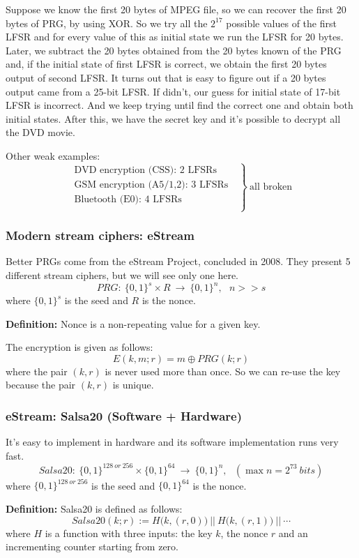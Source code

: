 \documentclass[12pt]{book}
\newcommand{\Def}{\textcolor{dkgreen}{\textbf{Definition:}} }
\begin{document}
Suppose we know the first 20 bytes of MPEG file, so we can recover the first 20 bytes of PRG, by using XOR. So we try all the $2^{17}$ possible values of the first LFSR and for every value of this as initial state we run the LFSR for 20 bytes. Later, we subtract the 20 bytes obtained from the 20 bytes known of the PRG and, if the initial state of first LFSR is correct, we obtain the first 20 bytes output of second LFSR. It turns out that is easy to figure out if a 20 bytes output came from a 25-bit LFSR. If didn't, our guess for initial state of 17-bit LFSR is incorrect. And we keep trying until find the correct one and obtain both initial states. After this, we have the secret key and it's possible to decrypt all the DVD movie.

Other weak examples:
$$\left.\begin{array}{l}
	\text{DVD encryption (CSS): 2 LFSRs}\\[0.2cm]
	\text{GSM encryption (A5/1,2): 3 LFSRs}\\[0.2cm]
	\text{Bluetooth (E0): 4 LFSRs}\\
\end{array}\ \ \ \right\}\ \text{all broken}$$

\subsubsection{Modern stream ciphers: eStream}
Better PRGs come from the eStream Project, concluded in 2008. They present 5 different stream ciphers, but we will see only one here.
$$PRG:\ \{0,1\}^{s}\times R\ \rightarrow\ \{0,1\}^{n},\ \ \ n>>s$$where $\{0,1\}^{s}$ is the seed and $R$ is the nonce.

\Def Nonce is a non-repeating value for a given key.

The encryption is given as follows:
$$E(k,m;r)=m\oplus PRG(k;r)$$where the pair $(k,r)$ is never used more than once. So we can re-use the key because the pair $(k,r)$ is unique.

\subsubsection{eStream: Salsa20 (Software + Hardware)}
It's easy to implement in hardware and its software implementation runs very fast.
$$Salsa20:\ \{0,1\}^{128\ or\ 256}\times\{0,1\}^{64}\ \rightarrow\ \{0,1\}^{n},\ \ \ (\max n=2^{73}\ bits)$$where $\{0,1\}^{128\ or\ 256}$ is the seed and $\{0,1\}^{64}$ is the nonce.

\Def Salsa20 is defined as follows:
$$Salsa20(k;r):=H\big(k,(r,0)\big)\ ||\ H\big(k,(r,1)\big)\ ||\ \cdots$$where $H$ is a function with three inputs: the key $k$, the nonce $r$ and an incrementing counter starting from zero.
\end{document}
